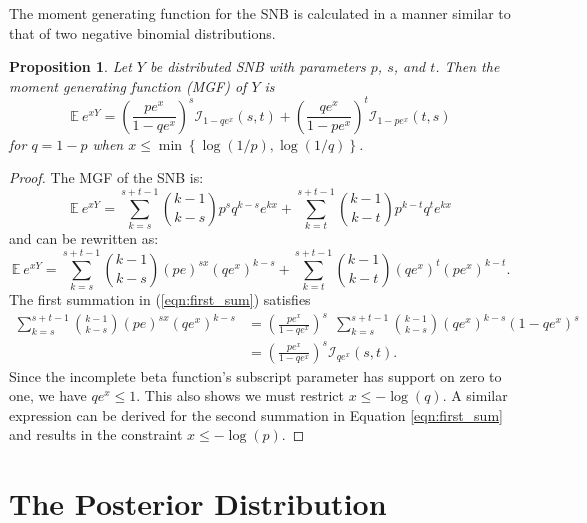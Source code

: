 \documentclass[review]{elsarticle}
\newtheorem{prop}{Proposition}
\begin{document}
The moment generating function for the SNB is calculated in a manner similar to 
that of two negative binomial distributions. 
\begin{prop} Let $Y$ be distributed SNB with parameters $p$, $s$, and $t$.
Then the moment generating function (MGF) of $Y$ is
\begin{equation} \label{eqn:mgf}
\mathbb{E}~e^{xY} = \left(\frac{p e^x}{1 - qe^x}\right)^s 
  \mathcal{I}_{1-qe^x} (s, t) + \left(\frac{qe^x}{1-pe^x}\right)^t 
  \mathcal{I}_{1-pe^x}(t, s)
\end{equation}
for $q = 1-p$ when $x \leq \min \left\{\log(1/p), \log(1/q) \right\}$.
\end{prop}
\begin{proof}
The MGF of the SNB is:
\begin{equation*}
\mathbb{E}~e^{xY} = \sum_{k=s}^{s+t-1} {k-1 \choose k-s} p^s q^{k-s} e^{kx} 
  + \sum_{k=t}^{s+t-1} {k-1 \choose k-t} p^{k-t} q^t e^{kx}
\end{equation*}
and can be rewritten as:
\begin{equation} \label{eqn:first_sum}
\mathbb{E}~e^{xY} = \sum_{k=s}^{s+t-1}{k-1 \choose k-s} (pe)^{sx} (qe^x)^{k-s} 
  + \sum_{k=t}^{s+t-1}{k-1 \choose k-t} (qe^x)^t (pe^x)^{k-t}.
\end{equation}
The first summation in (\ref{eqn:first_sum}) satisfies
\begin{align*}
\sum_{k=s}^{s+t-1}{k-1 \choose k-s} (pe)^{sx} (qe^x)^{k-s} &= 
  \left(\frac{pe^x}{1 - qe^x}\right)^s \ \ \sum_{k=s}^{s+t-1} {k-1 \choose k-s} 
    (qe^x)^{k-s} (1-qe^x)^s \\
  &= \left(\frac{pe^x}{1 - qe^x}\right)^s \mathcal{I}_{qe^x}(s, t).
\end{align*}
Since the incomplete beta function's subscript parameter has support on zero 
to one, we have $qe^x \leq 1$. This also shows we must restrict
$x \leq -\log(q)$.
A similar expression can be derived for the second summation in 
Equation \ref{eqn:first_sum} and results in
the constraint $x \leq -\log(p)$.
\end{proof}

\section{The Posterior Distribution}
\end{document}
